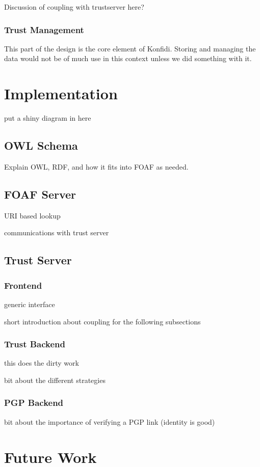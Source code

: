\documentclass{acm_proc_article-sp}
\begin{document}
Discussion of coupling with trustserver here?

\subsubsection{Trust Management}
This part of the design is the core element of Konfidi.  Storing and managing the data would not be of much use in this context unless we did something with it. 

\section{Implementation}
put a shiny diagram in here

\subsection{OWL Schema}
Explain OWL, RDF, and how it fits into FOAF as needed.

\subsection{FOAF Server}
URI based lookup

communications with trust server

\subsection{Trust Server}

\subsubsection{Frontend}
generic interface

short introduction about coupling for the following subsections

\subsubsection{Trust Backend}
this does the dirty work

bit about the different strategies

\subsubsection{PGP Backend}
bit about the importance of verifying a PGP link (identity is good)

\section{Future Work}
\end{document}

